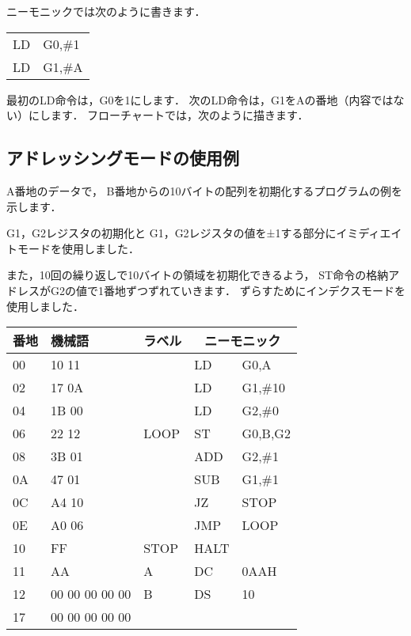 ニーモニックでは次のように書きます．
{\tt\begin{center}
\begin{tabular}{l l}
LD & G0,\#1       \\
LD & G1,\#A       \\
\end{tabular}
\end{center}}

最初のLD命令は，G0を1にします．
次のLD命令は，G1をAの番地（内容ではない）にします．
フローチャートでは，次のように描きます．

\begin{center}
\end{center}

\newpage
\subsection{アドレッシングモードの使用例}
A番地のデータで，
B番地からの10バイトの配列を初期化するプログラムの例を示します．

G1，G2レジスタの初期化と
G1，G2レジスタの値を±1する部分にイミディエイトモードを使用しました．

また，10回の繰り返しで10バイトの領域を初期化できるよう，
ST命令の格納アドレスがG2の値で1番地ずつずれていきます．
ずらすためにインデクスモードを使用しました．

{\small\tt\begin{center}
\begin{tabular}{|l|l|l|l l|} \hline
番地 & 機械語 & ラベル & \multicolumn{2}{|c|}{ニーモニック} \\
\hline
00 & 10 11 &      & LD   & G0,A          \\
02 & 17 0A &      & LD   & G1,\#10       \\
04 & 1B 00 &      & LD   & G2,\#0        \\
06 & 22 12 & LOOP & ST   & G0,B,G2       \\
08 & 3B 01 &      & ADD  & G2,\#1        \\
0A & 47 01 &      & SUB  & G1,\#1        \\
0C & A4 10 &      & JZ   & STOP          \\
0E & A0 06 &      & JMP  & LOOP          \\
10 & FF    & STOP & HALT &               \\
11 & AA    & A    & DC   & 0AAH          \\
12 & 00 00 00 00 00 & B    & DS   & 10            \\
17 & 00 00 00 00 00 &      &      &               \\
\hline
\end{tabular}
\end{center}}


